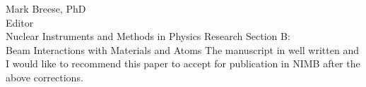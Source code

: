 \documentclass{letter} %
\begin{document}
\begin{letter}{Mark Breese, PhD \\
Editor \\
Nuclear Instruments and Methods in Physics Research Section B: \\
Beam Interactions with Materials and Atoms}
The manuscript in well written and I would like to recommend this paper to accept for publication in NIMB after the above corrections.





 

 

\end{letter}
 
\end{document}
